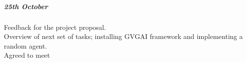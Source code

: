 \documentclass[a4paper]{article}
\begin{document}
\subparagraph{25th October}
Feedback for the project proposal.\\
Overview of next set of tasks; installing GVGAI framework and implementing a random agent. \\
Agreed to meet
\end{document}
